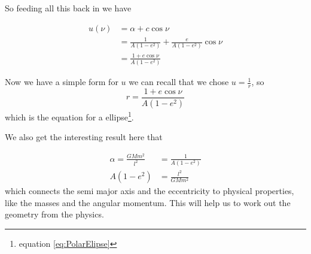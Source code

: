 So feeding all this back in we have

\begin{align}
u(\nu)&=\alpha + c \cos \nu \nonumber \\
&=\frac{1}{A(1-e^2)} + \frac{e}{A(1-e^2)} \cos \nu \nonumber \\
&=\frac{1+e\cos\nu}{A(1-e^2)}
\end{align}

Now we have a simple form for $u$ we can recall that we chose $u=\frac{1}{r}$, so
\begin{equation}
r=\frac{1+e\cos\nu}{A(1-e^2)}
\end{equation}
which is the equation for a ellipse\footnote{equation \ref{eq:PolarElipse}}.

We also get the interesting result here that

\begin{align}
\alpha = \frac{GMm^2}{l^2}&=\frac{1}{A(1-e^2)} \nonumber \\
A(1-e^2)&=\frac{l^2}{GMm^2} \label{eq:link}
\end{align}
which connects the semi major axis and the eccentricity to physical properties, like the masses and the angular momentum. This will help us to work out the geometry from the physics.
